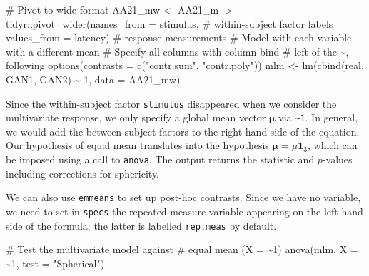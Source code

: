 \documentclass[
  11pt,
  letterpaper,
]{scrbook}
\newenvironment{Shaded}{\begin{snugshade}}{\end{snugshade}}
\newcommand{\AttributeTok}[1]{\textcolor[rgb]{0.40,0.45,0.13}{#1}}
\newcommand{\CommentTok}[1]{\textcolor[rgb]{0.37,0.37,0.37}{#1}}
\newcommand{\DecValTok}[1]{\textcolor[rgb]{0.68,0.00,0.00}{#1}}
\newcommand{\FunctionTok}[1]{\textcolor[rgb]{0.28,0.35,0.67}{#1}}
\newcommand{\NormalTok}[1]{\textcolor[rgb]{0.00,0.23,0.31}{#1}}
\newcommand{\OtherTok}[1]{\textcolor[rgb]{0.00,0.23,0.31}{#1}}
\newcommand{\SpecialCharTok}[1]{\textcolor[rgb]{0.37,0.37,0.37}{#1}}
\newcommand{\StringTok}[1]{\textcolor[rgb]{0.13,0.47,0.30}{#1}}
\theoremstyle{definition}
\theoremstyle{remark}
\begin{document}
\begin{Shaded}
\begin{Highlighting}[]
\CommentTok{\# Pivot to wide format}
\NormalTok{AA21\_mw }\OtherTok{\textless{}{-}}\NormalTok{ AA21\_m }\SpecialCharTok{|\textgreater{}}
\NormalTok{  tidyr}\SpecialCharTok{::}\FunctionTok{pivot\_wider}\NormalTok{(}\AttributeTok{names\_from =}\NormalTok{ stimulus, }\CommentTok{\# within{-}subject factor labels}
                     \AttributeTok{values\_from =}\NormalTok{ latency) }\CommentTok{\# response measurements }
\CommentTok{\# Model with each variable with a different mean}
\CommentTok{\# Specify all columns with column bind }
\CommentTok{\# left of the \textasciitilde{}, following }
\FunctionTok{options}\NormalTok{(}\AttributeTok{contrasts =} \FunctionTok{c}\NormalTok{(}\StringTok{"contr.sum"}\NormalTok{, }\StringTok{"contr.poly"}\NormalTok{))}
\NormalTok{mlm }\OtherTok{\textless{}{-}} \FunctionTok{lm}\NormalTok{(}\FunctionTok{cbind}\NormalTok{(real, GAN1, GAN2) }\SpecialCharTok{\textasciitilde{}} \DecValTok{1}\NormalTok{,}
          \AttributeTok{data =}\NormalTok{ AA21\_mw)}
\end{Highlighting}
\end{Shaded}

Since the within-subject factor \texttt{stimulus} disappeared when we
consider the multivariate response, we only specify a global mean vector
\(\boldsymbol{\mu}\) via \texttt{\textasciitilde{}1}. In general, we
would add the between-subject factors to the right-hand side of the
equation. Our hypothesis of equal mean translates into the hypothesis
\(\boldsymbol{\mu} = \mu\boldsymbol{1}_3\), which can be imposed using a
call to \texttt{anova}. The output returns the statistic and
\(p\)-values including corrections for sphericity.

We can also use \texttt{emmeans} to set up post-hoc contrasts. Since we
have no variable, we need to set in \texttt{specs} the repeated measure
variable appearing on the left hand side of the formula; the latter is
labelled \texttt{rep.meas} by default.

\begin{Shaded}
\begin{Highlighting}[]
\CommentTok{\# Test the multivariate model against}
\CommentTok{\# equal mean (X = \textasciitilde{}1)}
\FunctionTok{anova}\NormalTok{(mlm, }\AttributeTok{X =} \SpecialCharTok{\textasciitilde{}}\DecValTok{1}\NormalTok{, }\AttributeTok{test =} \StringTok{"Spherical"}\NormalTok{)}
\end{Highlighting}
\end{Shaded}
\end{document}
